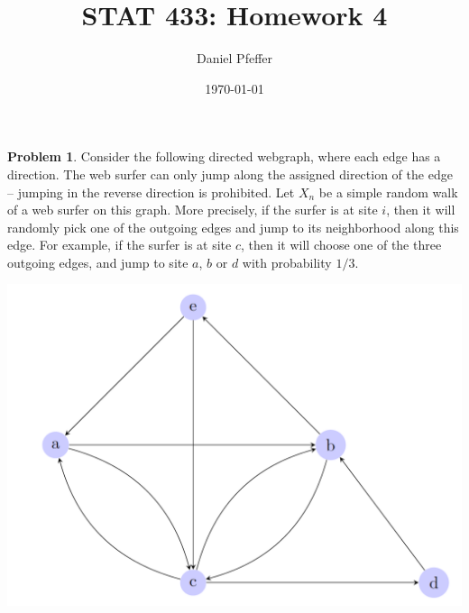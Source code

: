 \documentclass[oneside,reqno]{amsart}
\title{STAT 433: Homework 4}
\author{Daniel Pfeffer}
\date{\today}
\theoremstyle{definition}
\newtheorem{prob}{Problem}
\begin{document}
\maketitle


\begin{prob}
Consider the following directed webgraph, where each edge has a direction. The web surfer can only jump along the assigned direction of the edge -- jumping in the reverse direction is prohibited. Let $X_n$ be a simple random walk of a web surfer on this graph. More precisely, if the surfer is at site $i$, then it will randomly pick one of the outgoing edges and jump to its neighborhood along this edge. For example, if the surfer is at site $c$, then it will choose one of the three outgoing edges, and jump to site $a$, $b$ or $d$ with probability $1/3$.
\begin{center}
\includegraphics[scale=0.5]{webgraph}
\end{center}
\end{prob}
\end{document}
